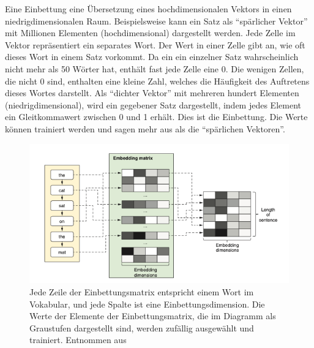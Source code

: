 Eine Einbettung eine Übersetzung eines hochdimensionalen Vektors in einen niedrigdimensionalen Raum. Beispielsweise kann ein Satz als \enquote{spärlicher Vektor} mit Millionen Elementen (hochdimensional) dargestellt werden. Jede Zelle im Vektor repräsentiert ein separates Wort. Der Wert in einer Zelle gibt an, wie oft dieses Wort in einem Satz vorkommt. Da ein ein einzelner Satz wahrscheinlich nicht mehr als 50 Wörter hat, enthält fast jede Zelle eine 0. Die wenigen Zellen, die nicht 0 sind, enthalten eine kleine Zahl, welches die Häufigkeit des Auftretens dieses Wortes darstellt. Als \enquote{dichter Vektor} mit mehreren hundert Elementen (niedrigdimensional), wird ein gegebener Satz dargestellt, indem jedes Element ein Gleitkommawert zwischen 0 und 1 erhält. Dies ist die Einbettung. Die Werte können trainiert werden und sagen mehr aus als die \enquote{spärlichen Vektoren}.

\begin{figure}[H]
    \centering
    \includegraphics[width=13cm]{kapitel3/embd.png}
    \caption[Darstellung der Worteinbettungen]{Jede Zeile der Einbettungsmatrix entspricht einem Wort im Vokabular, und jede Spalte ist eine Einbettungsdimension. Die Werte der Elemente der Einbettungsmatrix, die im Diagramm als Graustufen dargestellt sind, werden zufällig ausgewählt und trainiert. Entnommen aus \cite[311]{cai2020deep}}
    \label{wordembgrau}
\end{figure}

